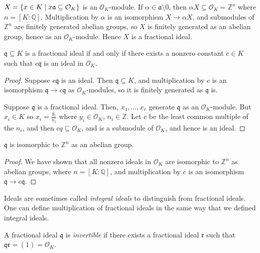 \( X = \qty{x \in K \mid x\mathfrak a \subseteq \mathcal O_K} \) is an \( \mathcal O_K \)-module.
If \( \alpha \in \mathfrak a \setminus \qty{0} \), then \( \alpha X \subseteq \mathcal O_K = \mathbb Z^n \) where \( n = [K:\mathbb Q] \).
Multiplication by \( \alpha \) is an isomorphism \( X \to \alpha X \), and submodules of \( \mathbb Z^n \) are finitely generated abelian groups, so \( X \) is finitely generated as an abelian group, hence as an \( \mathcal O_K \)-module.
Hence \( X \) is a fractional ideal.
\begin{lemma}
    \( \mathfrak q \subseteq K \) is a fractional ideal if and only if there exists a nonzero constant \( c \in K \) such that \( c\mathfrak q \) is an ideal in \( \mathcal O_K \).
\end{lemma}
\begin{proof}
    Suppose \( c\mathfrak q \) is an ideal.
    Then \( \mathfrak q \subseteq K \), and multiplication by \( c \) is an isomorphism \( \mathfrak q \to c\mathfrak q \) as \( \mathcal O_K \)-modules, so it is finitely generated as \( \mathfrak q \) is.

    Suppose \( \mathfrak q \) is a fractional ideal.
    Then, \( x_1, \dots, x_r \) generate \( \mathfrak q \) as an \( \mathcal O_K \)-module.
    But \( x_i \in K \) so \( x_i = \frac{y_i}{n_i} \) where \( y_i \in \mathcal O_K \), \( n_i \in \mathbb Z \).
    Let \( c \) be the least common multiple of the \( n_i \), and then \( cq \subseteq \mathcal O_K \), and is a submodule of \( \mathcal O_K \), and hence is an ideal.
\end{proof}
\begin{corollary}
    \( \mathfrak q \) is isomorphic to \( \mathbb Z^n \) as an abelian group.
\end{corollary}
\begin{proof}
    We have shown that all nonzero ideals in \( \mathcal O_K \) are isomorphic to \( \mathbb Z^n \) as abelian groups, where \( n = [K:\mathbb Q] \), and multiplication by \( c \) is an isomorphism \( \mathfrak q \to c\mathfrak q \).
\end{proof}
Ideals are sometimes called \emph{integral ideals} to distinguish from fractional ideals.
One can define multiplication of fractional ideals in the same way that we defined integral ideals.
\begin{definition}
    A fractional ideal \( \mathfrak q \) is \emph{invertible} if there exists a fractional ideal \( \mathfrak r \) such that \( \mathfrak q\mathfrak r = (1) = \mathcal O_K \).
\end{definition}
